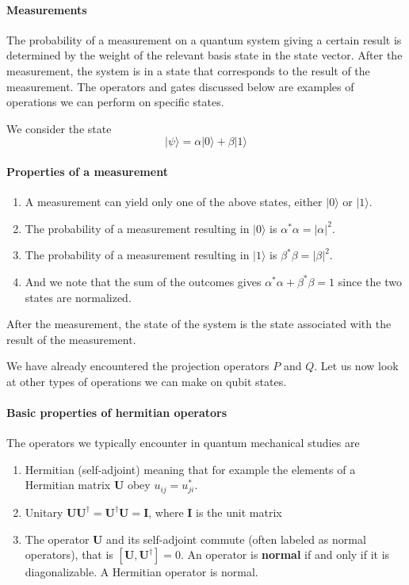 \paragraph{Measurements}

The probability of a measurement on a quantum system giving a certain
result is determined by the weight of the relevant basis state in the
state vector. After the measurement, the system is in a state that
corresponds to the result of the measurement. The operators and
gates discussed below are examples of operations we can perform on
specific states.

We  consider the state
\[
\vert \psi\rangle = \alpha \vert 0 \rangle +\beta \vert 1 \rangle
\]


\paragraph{Properties of a measurement}

\begin{enumerate}
\item A measurement can yield only one of the above states, either $\vert 0\rangle$ or $\vert 1\rangle$.

\item The probability of a measurement resulting in $\vert 0\rangle$ is $\alpha^*\alpha = \vert \alpha \vert^2$.

\item The probability of a measurement resulting in $\vert 1\rangle$ is $\beta^*\beta = \vert \beta \vert^2$.

\item And we note that the sum of the outcomes gives $\alpha^*\alpha+\beta^*\beta=1$ since the two states are normalized.
\end{enumerate}


After the measurement, the state of the system is the state associated with the result of the measurement.

We have already encountered the projection operators $P$ and $Q$. Let
us now look at other types of operations we can make on qubit states.


\paragraph{Basic properties of hermitian operators}

The operators we typically encounter in quantum mechanical studies are
\begin{enumerate}
\item Hermitian (self-adjoint) meaning that for example the elements of a Hermitian matrix $\bm{U}$ obey $u_{ij}=u_{ji}^*$.

\item Unitary $\bm{U}\bm{U}^{\dagger}=\bm{U}^{\dagger}\bm{U}=\bm{I}$, where $\bm{I}$ is the unit matrix

\item The operator $\bm{U}$ and its self-adjoint commute (often labeled as normal operators), that is  $[\bm{U},\bm{U}^{\dagger}]=0$. An operator is \textbf{normal} if and only if it is diagonalizable. A Hermitian operator is normal.
\end{enumerate}


